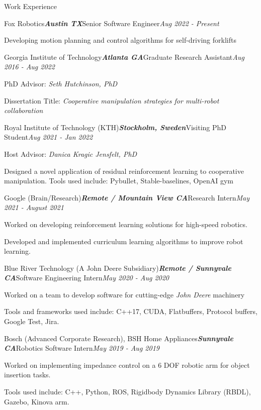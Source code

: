 \documentclass{resume} %
\begin{document}
\begin{rSection}{Work Experience}
\begin{rSubsection}{Fox Robotics}{\bf \em Austin TX}{Senior Software Engineer}{\em Aug 2022 - Present}
\item Developing motion planning and control algorithms for self-driving forklifts
\end{rSubsection}

\begin{rSubsection}{Georgia Institute of Technology}{\bf \em Atlanta GA}{Graduate Research Assistant}{\em Aug 2016 - Aug 2022}
\item PhD Advisor: {\em Seth Hutchinson, PhD}
\item Dissertation Title: {\em Cooperative manipulation strategies for multi-robot collaboration}
\end{rSubsection}

\begin{rSubsection}{Royal Institute of Technology (KTH)}{\bf \em Stockholm, Sweden}{Visiting PhD Student}{\em Aug 2021 - Jan 2022}
\item Host Advisor: {\em Danica Kragic Jensfelt, PhD}
\item Designed a novel application of residual reinforcement learning to cooperative manipulation. Tools used include: Pybullet, Stable-baselines, OpenAI gym
\end{rSubsection}

\begin{rSubsection}{Google (Brain/Research)}{\bf \em Remote / Mountain View CA}{Research Intern}{\em May 2021 - August 2021}
\item Worked on developing reinforcement learning solutions for high-speed robotics.
\item Developed and implemented curriculum learning algorithms to improve robot learning.
\end{rSubsection}

\begin{rSubsection}{Blue River Technology (A John Deere Subsidiary)}{\bf \em Remote / Sunnyvale CA}{Software Engineering Intern}{\em May 2020 - Aug 2020}
\item Worked on a team to develop software for cutting-edge {\em John Deere} machinery
\item Tools and frameworks used include: C++17, CUDA, Flatbuffers, Protocol buffers, Google Test, Jira.
\end{rSubsection}

\begin{rSubsection}{Bosch (Advanced Corporate Research), BSH Home Appliances}{\bf \em Sunnyvale CA}{Robotics Software Intern}{\em May 2019 - Aug 2019}
\item Worked on implementing impedance control on a 6 DOF robotic arm for object insertion tasks.
\item Tools used include: C++, Python, ROS, Rigidbody Dynamics Library (RBDL), Gazebo, Kinova arm.
\end{rSubsection}


\end{rSection}
\end{document}
